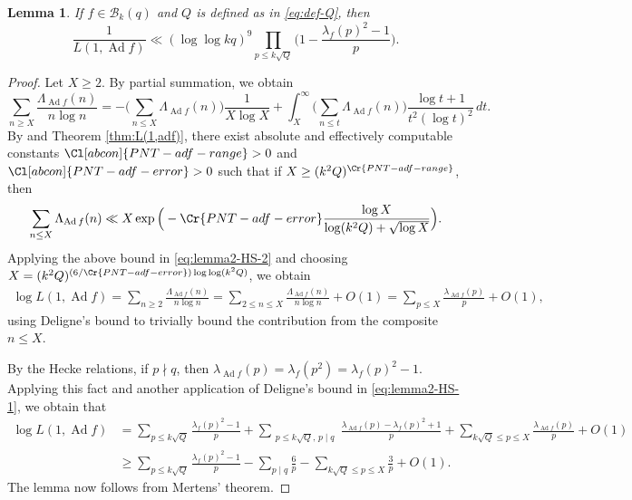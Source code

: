 \documentclass[12pt,reqno]{amsart}
\newtheorem{lem}[thm]{Lemma}
\theoremstyle{remark}
\DeclareMathOperator{\ad}{Ad}
\numberwithin{equation}{section}
\begin{document}
        \begin{lem}
        \label{lem:L(1,adf)}    If $f \in \mathcal{B}_k(q)$ and $Q$ is defined as in \eqref{eq:def-Q}, then 
		\[
		\frac{1}{L(1, \ad f)} \ll (\log\log kq)^{9} \prod_{p \le k\sqrt{Q}}\Big( 1-\frac{\lambda_f(p)^2-1}{p}\Big).
		\]
	\end{lem}
	\begin{proof} 
		Let $X \ge 2$. By partial summation, we obtain
		\begin{equation}\label{eq:lemma2-HS-2}
			\sum_{n \ge X}\frac{\Lambda_{\ad f}(n)}{n \log n} = -\Big(\sum_{n\leq X}
			\Lambda_{\ad f}(n)\Big) \frac{1}{X\log X} +\int_X^{\infty} \Big(\sum_{n\le t} \Lambda_{\ad f}(n)\Big) \frac{\log t+1}{t^2(\log t)^2} \, dt.
		\end{equation}
        By \cite[Theorem 2.4]{KT} and Theorem \ref{thm:L(1,adf)}, 
		there exist absolute and effectively computable constants $\Cl[abcon]{PNT-adf-range}>0$ and $\Cl[abcon]{PNT-adf-error}>0$ such that if $X \ge (k^2Q)^{\Cr{PNT-adf-range}}$, then 
		\[
		\sum_{n \le X} \Lambda_{\ad f}(n) \ll X\exp\Big(-\Cr{PNT-adf-error} \frac{\log X}{\log(k^2Q) +\sqrt{\log X}}\Big).
		\]
	 Applying the above bound in \eqref{eq:lemma2-HS-2} and choosing $X = (k^2Q)^{(6/\Cr{PNT-adf-error})\log\log (k^2Q)}$, we obtain
    \begin{equation}\label{eq:lemma2-HS-1}
    \begin{aligned}
			\log L(1, \ad f) = \sum_{n \ge 2} \frac{\Lambda_{\ad f}(n)}{n \log n} = \sum_{2 \le n \le X}\frac{\Lambda_{\ad f}(n)}{n \log n} + O(1) =\sum_{p \le X} \frac{\lambda_{\ad f}(p)}{p}+O(1),
   \end{aligned}
    \end{equation}
    using Deligne's bound to trivially bound the contribution from the composite $n\leq X$.  
    
    By the Hecke relations, if $p\nmid q$, then $\lambda_{\ad f}(p)=\lambda_f(p^2)=\lambda_f(p)^2-1$.  Applying this fact and another application of Deligne's bound in \eqref{eq:lemma2-HS-1}, we obtain that
    \begin{align*}
    \log L(1,\ad f)&=\sum_{p\leq k\sqrt{Q}}\frac{\lambda_f(p)^2-1}{p}+\sum_{\substack{p\leq k\sqrt{Q},\, p\mid q}}\frac{\lambda_{\ad f}(p)-\lambda_f(p)^2+1}{p} + \sum_{k\sqrt{Q} \le p \le X} \frac{\lambda_{\ad f}(p)}{p}+O(1)\\
    &\geq \sum_{p\leq k\sqrt{Q}}\frac{\lambda_f(p)^2-1}{p}-\sum_{p\mid q}\frac{6}{p} - \sum_{k\sqrt{Q} \le p \le X} \frac{3}{p}+O(1).
    \end{align*}
    The lemma now follows from Mertens' theorem.
    \end{proof}
    
\end{document}
